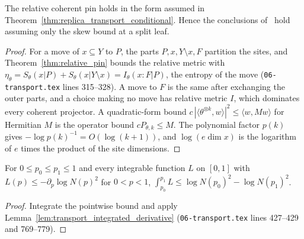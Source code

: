 \begin{theorem}
    \label{thm:replica_transport_skew_conditional}
    \leanok
    The relative coherent pin holds in the form assumed in
    Theorem~\ref{thm:replica_transport_conditional}. Hence the conclusions
    of~\cite[Proposition~7.4]{OpenAI2026AreaLaw} hold assuming only the skew bound at a
    split leaf.
\end{theorem}

\begin{proof}\leanok
    For a move of $x\subseteq Y$ to $P$, the parts $P,x,Y\setminus x,F$ partition the
    sites, and Theorem~\ref{thm:relative_pin} bounds the relative metric with
    $\eta_\theta=S_\theta(x|P)+S_\theta(x|Y\setminus x)=I_\theta(x:F|P)$, the entropy of the
    move (\texttt{06-transport.tex} lines 315--328). A move to $F$ is the same after
    exchanging the outer parts, and a choice making no move has relative metric $I$, which
    dominates every coherent projector. A quadratic-form bound
    $c\,|\langle\theta^{\otimes k},w\rangle|^2\le\langle w,Mw\rangle$ for Hermitian $M$ is the
    operator bound $cP_{\theta,k}\le M$. The polynomial factor $p(k)$ gives
    $-\log p(k)^{-1}=O(\log(k+1))$, and $\log(e\dim x)$ is the logarithm of $e$ times the
    product of the site dimensions.
\end{proof}

\begin{corollary}\label{cor:replica_transport_integrated}
    \leanok
    For $0\le p_0\le p_1\le1$ and every integrable function $L$ on $[0,1]$ with
    $L(p)\le-\partial_p\log N(p)^2$ for $0<p<1$,
    $\int_{p_0}^{p_1}L\le\log N(p_0)^2-\log N(p_1)^2$.
\end{corollary}

\begin{proof}\leanok
    Integrate the pointwise bound and apply
    Lemma~\ref{lem:transport_integrated_derivative} (\texttt{06-transport.tex}
    lines 427--429 and 769--779).
\end{proof}

